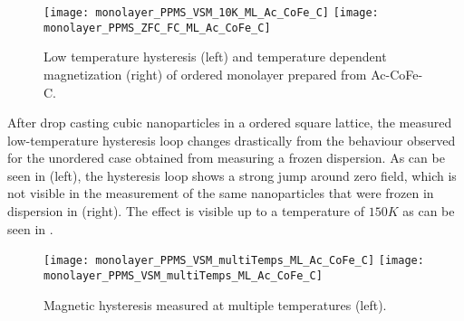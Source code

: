 \documentclass[\main/dresen_thesis.tex]{subfiles}
\begin{document}
  \begin{figure}[tb]
    \centering
    \texttt{[image: monolayer\_PPMS\_VSM\_10K\_ML\_Ac\_CoFe\_C]}
    \texttt{[image: monolayer\_PPMS\_ZFC\_FC\_ML\_Ac\_CoFe\_C]}
    \caption{\label{fig:monolayer:magneticStructure:ppms}Low temperature hysteresis (left) and temperature dependent magnetization (right) of ordered monolayer prepared from Ac-CoFe-C.}
  \end{figure}
  After drop casting cubic nanoparticles in a ordered square lattice, the measured low-temperature hysteresis loop changes drastically from the behaviour observed for the unordered case obtained from measuring a frozen dispersion.
  As can be seen in  (left), the hysteresis loop shows a strong jump around zero field, which is not visible in the measurement of the same nanoparticles that were frozen in dispersion in  (right).
  The effect is visible up to a temperature of $150 \unit{K}$ as can be seen in .
  \begin{figure}[tb]
    \centering
    \texttt{[image: monolayer\_PPMS\_VSM\_multiTemps\_ML\_Ac\_CoFe\_C]}
    \texttt{[image: monolayer\_PPMS\_VSM\_multiTemps\_ML\_Ac\_CoFe\_C]}
    \caption{\label{fig:monolayer:magneticStructure:ppmsMultiT}Magnetic hysteresis measured at multiple temperatures (left).}
  \end{figure}
\end{document}
